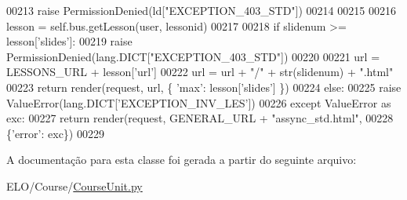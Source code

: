 \begin{DoxyCode}
00213                             \textcolor{keywordflow}{raise} PermissionDenied(ld[\textcolor{stringliteral}{"EXCEPTION\_403\_STD"}])
00214                         
00215 
00216                     lesson = self.bus.getLesson(user, lessonid)
00217 
00218                     \textcolor{keywordflow}{if} slidenum >= lesson[\textcolor{stringliteral}{'slides'}]:
00219                         \textcolor{keywordflow}{raise} PermissionDenied(lang.DICT[\textcolor{stringliteral}{"EXCEPTION\_403\_STD"}])
00220 
00221                     url = LESSONS\_URL + lesson[\textcolor{stringliteral}{'url'}]
00222                     url = url + \textcolor{stringliteral}{"/"} + str(slidenum) + \textcolor{stringliteral}{".html"}
00223                     \textcolor{keywordflow}{return} render(request, url, \{ \textcolor{stringliteral}{'max'}: lesson[\textcolor{stringliteral}{'slides'}] \})
00224                 \textcolor{keywordflow}{else}:
00225                     \textcolor{keywordflow}{raise} ValueError(lang.DICT[\textcolor{stringliteral}{'EXCEPTION\_INV\_LES'}])
00226             \textcolor{keywordflow}{except} ValueError \textcolor{keyword}{as} exc:
00227                 \textcolor{keywordflow}{return} render(request, GENERAL\_URL + \textcolor{stringliteral}{"assync\_std.html"},
00228                         \{\textcolor{stringliteral}{'error'}: exc\})
00229                 

\end{DoxyCode}


A documentação para esta classe foi gerada a partir do seguinte arquivo\-:\begin{DoxyCompactItemize}
\item 
E\-L\-O/\-Course/\hyperlink{CourseUnit_8py}{Course\-Unit.\-py}\end{DoxyCompactItemize}
